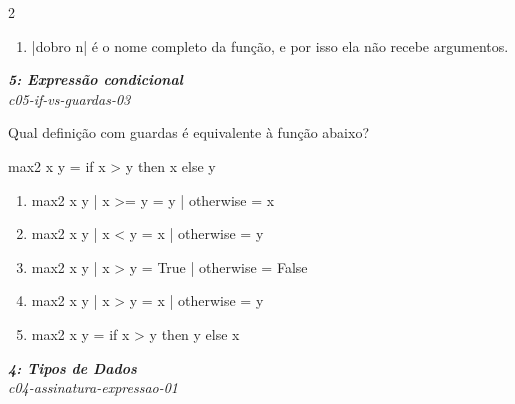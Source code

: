\documentclass[a4paper,10pt,brazil]{article}
\begin{document}
\begin{multicols}{2}
\begin{enumerate}
  \item \haskellinline|dobro n| é o nome completo da função, e por isso ela não recebe argumentos.


\end{enumerate}

\begin{flushright}
  \footnotesize
  \textit{\textbf{5: Expressão condicional}}\\
  \textit{c05-if-vs-guardas-03}\\

\end{flushright}
Qual definição com guardas é equivalente à função abaixo?
\begin{haskellcode}
max2 x y = if x > y then x else y
\end{haskellcode}

\begin{enumerate}
  \item \begin{haskellcode}
max2 x y
  | x >= y    = y
  | otherwise = x
\end{haskellcode}

  \item \begin{haskellcode}
max2 x y
  | x < y     = x
  | otherwise = y
\end{haskellcode}

  \item \begin{haskellcode}
max2 x y
  | x > y     = True
  | otherwise = False
\end{haskellcode}

  \item \begin{haskellcode}
max2 x y
  | x > y     = x
  | otherwise = y
\end{haskellcode}

  \item \begin{haskellcode}
max2 x y = if x > y then y else x
\end{haskellcode}


\end{enumerate}

\begin{flushright}
  \footnotesize
  \textit{\textbf{4: Tipos de Dados}}\\
  \textit{c04-assinatura-expressao-01}\\


\end{flushright}
\end{multicols}
\end{document}
